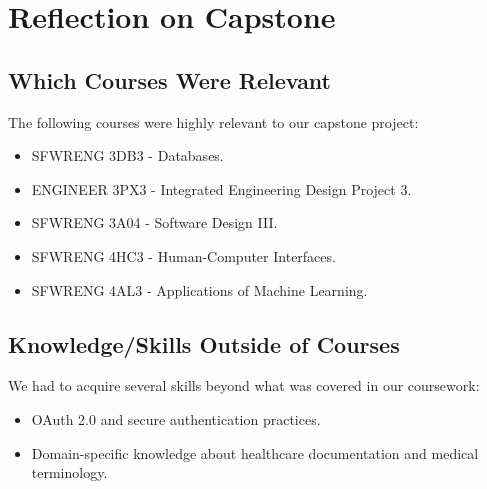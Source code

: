 \documentclass{article}
\begin{document}
 \section{Reflection on Capstone}
 
 \subsection{Which Courses Were Relevant}
 
 The following courses were highly relevant to our capstone project:
 \begin{itemize}
     \item SFWRENG 3DB3 - Databases.
     \item ENGINEER 3PX3 - Integrated Engineering Design Project 3.
     \item SFWRENG 3A04 - Software Design III.
     \item SFWRENG 4HC3 - Human-Computer Interfaces.
     \item SFWRENG 4AL3 - Applications of Machine Learning.
 \end{itemize}
 
 \subsection{Knowledge/Skills Outside of Courses}
 
 We had to acquire several skills beyond what was covered in our coursework:
 \begin{itemize}
     \item OAuth 2.0 and secure authentication practices.
     \item Domain-specific knowledge about healthcare documentation and medical terminology.
 \end{itemize}
\end{document}
